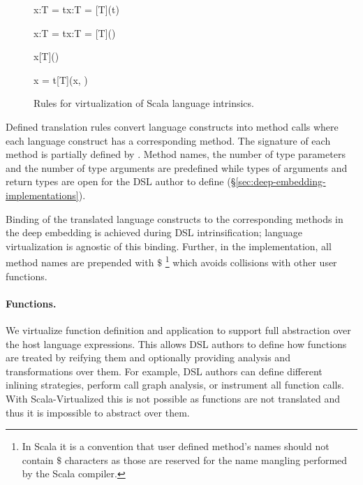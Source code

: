 \begin{figure}[!ht]
\begin{multicols}{2}
    \infyyax{}
      {\;x:T = t}{\;x:T = [T](t)}

    \infyyax{}
      {\;x:T = t}{\;x:T = [T]()}
\end{multicols}

\begin{multicols}{2}
    \infyy{}
      {}
      {x}{[T]()}

    \infyy{}
      {}
      {x = t}{[T](x, )}
\end{multicols}

\caption{Rules for virtualization of Scala language intrinsics.}
\label{fig:virt-core}
\end{figure}


 Defined translation rules convert language constructs into method calls where each language construct has
  a corresponding method. The signature of each method is partially defined by \yy. Method names, the number of
  type parameters and the number of type arguments are predefined while types of arguments and return types
  are open for the DSL author to define (\S \ref{sec:deep-embedding-implementations}).

 Binding of the translated language constructs to the corresponding methods
  in the deep embedding is achieved during DSL intrinsification; language virtualization is
  agnostic of this binding. Further, in the implementation, all method names are prepended with $\$$
  \footnote{In Scala it is a convention that user defined method's names should not contain $\$$ characters as those are reserved for the name mangling performed by the Scala compiler.} which avoids collisions with other user functions.

 \paragraph{Functions.} We virtualize function definition and application to support full abstraction over the host
  language expressions. This allows DSL authors to define how functions are treated by
  reifying them and optionally providing analysis and transformations over them. For example, DSL authors
  can define different inlining strategies, perform call graph analysis, or instrument all function calls. With Scala-Virtualized this is not possible as functions are not translated and thus it is impossible to
  abstract over them.

